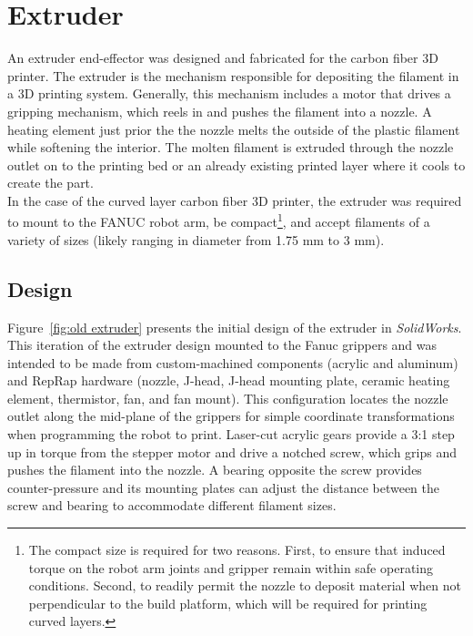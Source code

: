 \section{Extruder}

An extruder end-effector was designed and fabricated for the carbon fiber 3D printer. The extruder is the mechanism responsible for depositing the filament in a 3D printing system. Generally, this mechanism includes a motor that drives a gripping mechanism, which reels in and pushes the filament into a nozzle. A heating element just prior the the nozzle melts the outside of the plastic filament while softening the interior. The molten filament is extruded through the nozzle outlet on to the printing bed or an already existing printed layer where it cools to create the part.\\

In the case of the curved layer carbon fiber 3D printer, the extruder was required to mount to the FANUC robot arm, be compact\footnote{The compact size is required for two reasons. First, to ensure that induced torque on the robot arm joints and gripper remain within safe operating conditions. Second, to readily permit the nozzle to deposit material when not perpendicular to the build platform, which will be required for printing curved layers.}, and accept filaments of a variety of sizes (likely ranging in diameter from 1.75 mm to 3 mm). \\

\subsection{Design}

\indent

Figure~\ref{fig:old extruder} presents the initial design of the extruder in \emph{SolidWorks}. This iteration of the extruder design mounted to the Fanuc grippers and was intended to be made from custom-machined components (acrylic and aluminum) and RepRap hardware (nozzle, J-head, J-head mounting plate, ceramic heating element, thermistor, fan, and fan mount). This configuration locates the nozzle outlet along the mid-plane of the grippers for simple coordinate transformations when programming the robot to print. Laser-cut acrylic gears provide a 3:1 step up in torque from the stepper motor and drive a notched screw, which grips and pushes the filament into the nozzle. A bearing opposite the screw provides counter-pressure and its mounting plates can adjust the distance between the screw and bearing to accommodate different filament sizes.\\

